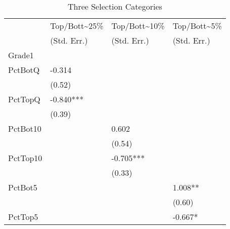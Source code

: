 
\thispagestyle{empty}
\begin{table}[htb]
  \centering
  \begin{threeparttable}
    \caption{Three Selection Categories}\label{tab:3sc}
    \begin{tabular}{l l l l} 
      \hline
      \hline
               & Top/Bott{\textasciitilde}25\% & Top/Bott{\textasciitilde}10\% & Top/Bott{\textasciitilde}5\% \\
               & (Std. Err.)                   & (Std. Err.)                   & (Std. Err.)                  \\
      \hline
      Grade1   &                               &                               &                              \\
      PctBotQ  & -0.314                        &                               &                              \\
               & (0.52)                        &                               &                              \\
      PctTopQ  & -0.840***                     &                               &                              \\
               & (0.39)                        &                               &                              \\
      PctBot10 &                               & 0.602                         &                              \\
               &                               & (0.54)                        &                              \\
      PctTop10 &                               & -0.705***                     &                              \\
               &                               & (0.33)                        &                              \\
      PctBot5  &                               &                               & 1.008**                      \\
               &                               &                               & (0.60)                       \\
      PctTop5  &                               &                               & -0.667*                      \\

\end{tabular}
\end{threeparttable}
\end{table}
